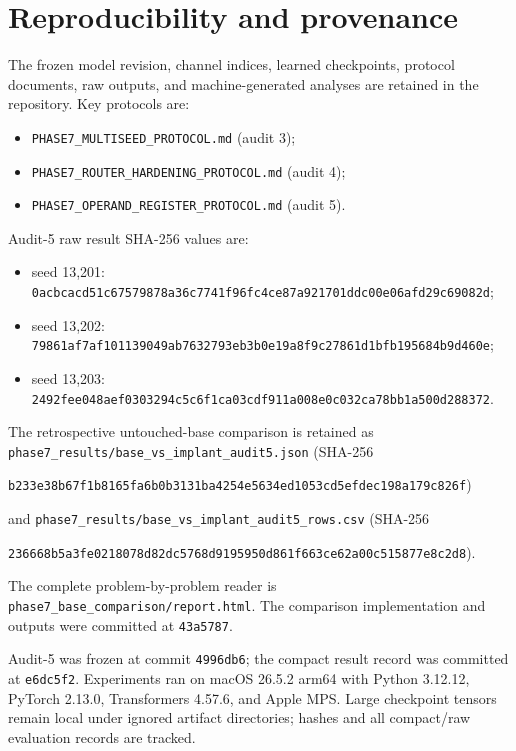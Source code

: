 \documentclass[11pt]{article}
\newcommand{\code}[1]{\texttt{#1}}
\begin{document}
\section{Reproducibility and provenance}

The frozen model revision, channel indices, learned checkpoints, protocol
documents, raw outputs, and machine-generated analyses are retained in the
repository. Key protocols are:

\begin{itemize}
\item \code{PHASE7\_MULTISEED\_PROTOCOL.md} (audit 3);
\item \code{PHASE7\_ROUTER\_HARDENING\_PROTOCOL.md} (audit 4);
\item \code{PHASE7\_OPERAND\_REGISTER\_PROTOCOL.md} (audit 5).
\end{itemize}

Audit-5 raw result SHA-256 values are:

\begin{sloppypar}
\begin{itemize}
\item seed 13,201:
\code{0acbcacd51c67579878a36c7741f96fc4ce87a921701ddc00e06afd29c69082d};
\item seed 13,202:
\code{79861af7af101139049ab7632793eb3b0e19a8f9c27861d1bfb195684b9d460e};
\item seed 13,203:
\code{2492fee048aef0303294c5c6f1ca03cdf911a008e0c032ca78bb1a500d288372}.
\end{itemize}
\end{sloppypar}

The retrospective untouched-base comparison is retained as
\code{phase7\_results/base\_vs\_implant\_audit5.json} (SHA-256
\begin{sloppypar}
\code{b233e38b67f1b8165fa6b0b3131ba4254e5634ed1053cd5efdec198a179c826f})
\end{sloppypar}
and \code{phase7\_results/base\_vs\_implant\_audit5\_rows.csv} (SHA-256
\begin{sloppypar}
\code{236668b5a3fe0218078d82dc5768d9195950d861f663ce62a00c515877e8c2d8}).
\end{sloppypar}
The complete problem-by-problem reader is
\code{phase7\_base\_comparison/report.html}. The comparison implementation and
outputs were committed at \code{43a5787}.

Audit-5 was frozen at commit \code{4996db6}; the compact result record was
committed at \code{e6dc5f2}. Experiments ran on macOS 26.5.2 arm64 with
Python 3.12.12, PyTorch 2.13.0, Transformers 4.57.6, and Apple MPS. Large
checkpoint tensors remain local under ignored artifact directories; hashes and
all compact/raw evaluation records are tracked.
\end{document}
